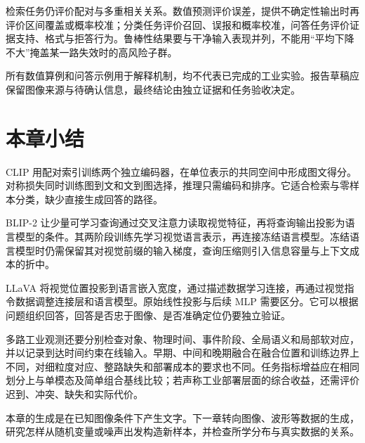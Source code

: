 检索任务仍评价配对与多重相关关系。数值预测评价误差，提供不确定性输出时再评价区间覆盖或概率校准；分类任务评价召回、误报和概率校准，问答任务评价证据支持、格式与拒答行为。鲁棒性结果要与干净输入表现并列，不能用“平均下降不大”掩盖某一路失效时的高风险子群。

所有数值算例和问答示例用于解释机制，均不代表已完成的工业实验。报告草稿应保留图像来源与待确认信息，最终结论由独立证据和任务验收决定。

\Needspace{.70\textheight}
\section*{本章小结}
CLIP 用配对索引训练两个独立编码器，在单位表示的共同空间中形成图文得分。对称损失同时训练图到文和文到图选择，推理只需编码和排序。它适合检索与零样本分类，缺少直接生成回答的路径。

BLIP-2 让少量可学习查询通过交叉注意力读取视觉特征，再将查询输出投影为语言模型的条件。其两阶段训练先学习视觉语言表示，再连接冻结语言模型。冻结语言模型时仍需保留其对视觉前缀的输入梯度，查询压缩则引入信息容量与上下文成本的折中。

LLaVA 将视觉位置投影到语言嵌入宽度，通过描述数据学习连接，再通过视觉指令数据调整连接层和语言模型。原始线性投影与后续 MLP 需要区分。它可以根据问题组织回答，回答是否忠于图像、是否准确定位仍要独立验证。

多路工业观测还要分别检查对象、物理时间、事件阶段、全局语义和局部软对应，并以记录到达时间约束在线输入。早期、中间和晚期融合在融合位置和训练边界上不同，对细粒度对应、整路缺失和部署成本的要求也不同。任务指标增益应在相同划分上与单模态及简单组合基线比较；若声称工业部署层面的综合收益，还需评价迟到、冲突、缺失和实际代价。

本章的生成是在已知图像条件下产生文字。下一章转向图像、波形等数据的生成，研究怎样从随机变量或噪声出发构造新样本，并检查所学分布与真实数据的关系。

\clearpage
